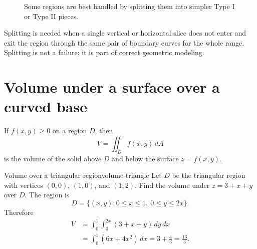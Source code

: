 \documentclass[11pt]{article}
\begin{document}
\begin{figure}[H]
\centering
{}
\caption{Some regions are best handled by splitting them into simpler Type I or Type II pieces.}
\end{figure}

\begin{notebox}
Splitting is needed when a single vertical or horizontal slice does not enter and exit the region through the same pair of boundary curves for the whole range. Splitting is not a failure; it is part of correct geometric modeling.
\end{notebox}

\section{Volume under a surface over a curved base}

If $f(x,y)\ge 0$ on a region $D$, then
\[
V=\iint_D f(x,y)\,dA
\]
is the volume of the solid above $D$ and below the surface $z=f(x,y)$.

\begin{examplebox}{Volume over a triangular region}{volume-triangle}
Let $D$ be the triangular region with vertices $(0,0)$, $(1,0)$, and $(1,2)$. Find the volume under $z=3+x+y$ over $D$.
The region is
\[
D=\{(x,y):0\le x\le 1,\ 0\le y\le 2x\}.
\]
Therefore
\[
\begin{aligned}
V&=\int_0^1\int_0^{2x}(3+x+y)\,dy\,dx \\
&=\int_0^1(6x+4x^2)\,dx=3+\frac43=\frac{13}{3}.
\end{aligned}
\]
\end{examplebox}
\end{document}
